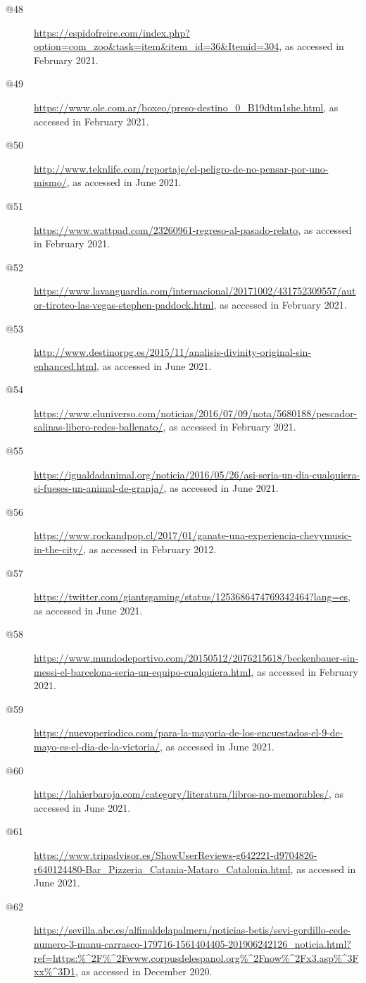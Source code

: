 \begin{flushleft}
\begin{description}
\item[@48] \url{https://espidofreire.com/index.php?option=com_zoo&task=item&item_id=36&Itemid=304}, as accessed in February 2021.
\item[@49] \url{https://www.ole.com.ar/boxeo/preso-destino_0_B19dtm1she.html}, as accessed in February 2021.
\item[@50] \url{http://www.teknlife.com/reportaje/el-peligro-de-no-pensar-por-uno-mismo/}, as accessed in June 2021.
\item[@51] \url{https://www.wattpad.com/23260961-regreso-al-pasado-relato}, as accessed in February 2021.
\item[@52] \url{https://www.lavanguardia.com/internacional/20171002/431752309557/autor-tiroteo-las-vegas-stephen-paddock.html}, as accessed in February 2021.
\item[@53] \url{http://www.destinorpg.es/2015/11/analisis-divinity-original-sin-enhanced.html}, as accessed in June 2021.
\item[@54] \url{https://www.eluniverso.com/noticias/2016/07/09/nota/5680188/pescador-salinas-libero-redes-ballenato/}, as accessed in February 2021.
\item[@55] \url{https://igualdadanimal.org/noticia/2016/05/26/asi-seria-un-dia-cualquiera-si-fueses-un-animal-de-granja/}, as accessed in June 2021.
\item[@56] \url{https://www.rockandpop.cl/2017/01/ganate-una-experiencia-chevymusic-in-the-city/}, as accessed in February 2012.
\item[@57] \url{https://twitter.com/giantsgaming/status/1253686474769342464?lang=es}, as accessed in June 2021.
\item[@58] \url{https://www.mundodeportivo.com/20150512/2076215618/beckenbauer-sin-messi-el-barcelona-seria-un-equipo-cualquiera.html}, as accessed in February 2021.
\item[@59] \url{https://nuevoperiodico.com/para-la-mayoria-de-los-encuestados-el-9-de-mayo-es-el-dia-de-la-victoria/}, as accessed in June 2021.
\item[@60] \url{https://lahierbaroja.com/category/literatura/libros-no-memorables/}, as accessed in June 2021.
\item[@61] \url{https://www.tripadvisor.es/ShowUserReviews-g642221-d9704826-r640124480-Bar_Pizzeria_Catania-Mataro_Catalonia.html}, as accessed in June 2021.
\item[@62] \url{https://sevilla.abc.es/alfinaldelapalmera/noticias-betis/sevi-gordillo-cede-numero-3-manu-carrasco-179716-1561404405-201906242126_noticia.html?ref=https:\%^2F\%^2Fwww.corpusdelespanol.org\%^2Fnow\%^2Fx3.asp\%^3Fxx\%^3D1}, as accessed in December 2020.

\end{description}
\end{flushleft}
